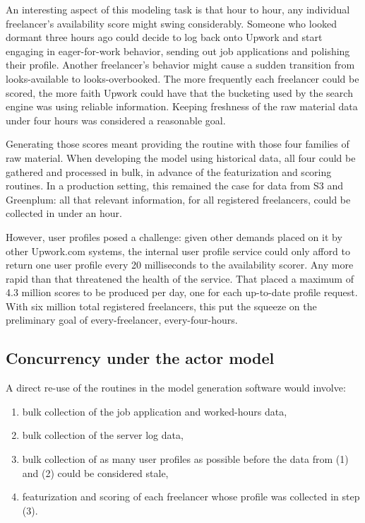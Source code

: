 \documentclass{article}
\begin{document}
 An interesting aspect of this modeling task is that hour to hour, any
individual freelancer's availability score might swing considerably. Someone who
looked dormant three hours ago could decide to log back onto Upwork and start
engaging in eager-for-work behavior, sending out job applications and polishing
their profile. Another freelancer's behavior might cause a sudden transition
from looks-available to looks-overbooked. The more frequently each freelancer
could be scored, the more faith Upwork could have that the bucketing used by the
search engine was using reliable information. Keeping freshness of the raw
material data under four hours was considered a reasonable goal.

 Generating those scores meant providing the routine with those four families of
raw material. When developing the model using historical data, all four could be
gathered and processed in bulk, in advance of the featurization and scoring
routines. In a production setting, this remained the case for data from S3 and
Greenplum: all that relevant information, for all registered freelancers, could
be collected in under an hour.

 However, user profiles posed a challenge: given other demands placed on it by
other Upwork.com systems, the internal user profile service could only afford to
return one user profile every 20 milliseconds to the availability scorer. Any
more rapid than that threatened the health of the service. That placed a maximum
of 4.3 million scores to be produced per day, one for each up-to-date profile
request. With six million total registered freelancers, this put the squeeze on
the preliminary goal of every-freelancer, every-four-hours.

\subsection{Concurrency under the actor model}

 A direct re-use of the routines in the model generation software would involve:

\begin{enumerate}
\item bulk collection of the job application and worked-hours data,
\item bulk collection of the server log data,
 \item bulk collection of as many user profiles as possible before the data from
(1) and (2) could be considered stale,
 \item featurization and scoring of each freelancer whose profile was collected
in step (3).
\end{enumerate}
\end{document}

